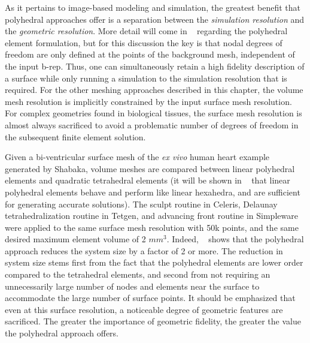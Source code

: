 As it pertains to image-based modeling and simulation, the greatest benefit that polyhedral approaches offer is a separation between the \textit{simulation resolution} and the \textit{geometric resolution}. More detail will come in ~ regarding the polyhedral element formulation, but for this discussion the key is that nodal degrees of freedom are only defined at the points of the background mesh, independent of the input b-rep. Thus, one can simultaneously retain a high fidelity description of a surface while only running a simulation to the simulation resolution that is required. For the other meshing approaches described in this chapter, the volume mesh resolution is implicitly constrained by the input surface mesh resolution. For complex geometries found in biological tissues, the surface mesh resolution is almost always sacrificed to avoid a problematic number of degrees of freedom in the subsequent finite element solution.

Given a bi-ventricular surface mesh of the \textit{ex vivo} human heart example generated by Shabaka, volume meshes are compared between linear polyhedral elements and quadratic tetrahedral elements (it will be shown in ~ that linear polyhedral elements behave and perform like linear hexahedra, and are sufficient for generating accurate solutions). The sculpt routine in Celeris, Delaunay tetrahedralization routine in Tetgen, and advancing front routine in Simpleware were applied to the same surface mesh resolution with 50k points, and the same desired maximum element volume of 2 $mm^3$. Indeed, ~ shows that the polyhedral approach reduces the system size by a factor of 2 or more. The reduction in system size stems first from the fact that the polyhedral elements are lower order compared to the tetrahedral elements, and second from not requiring an unnecessarily large number of nodes and elements near the surface to accommodate the large number of surface points. It should be emphasized that even at this surface resolution, a noticeable degree of geometric features are sacrificed. The greater the importance of geometric fidelity, the greater the value the polyhedral approach offers.

